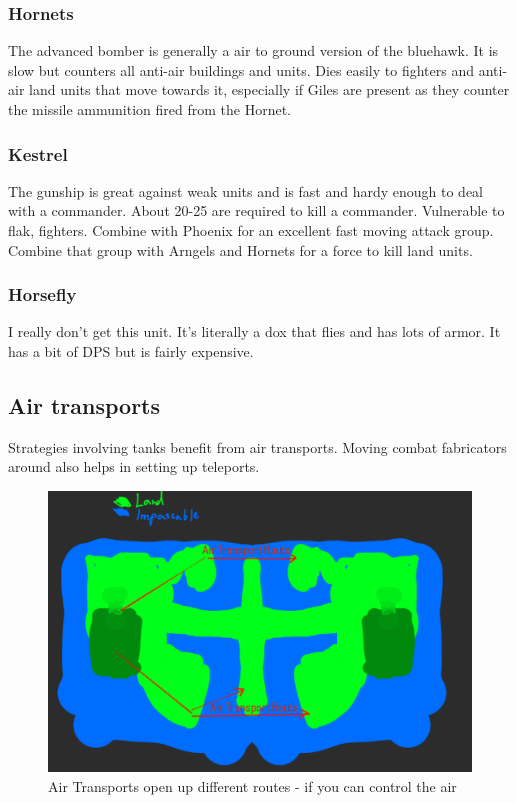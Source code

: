 \documentclass[]{article}
\begin{document}
\subsubsection{Hornets}

The advanced bomber is generally a air to ground version of the bluehawk.  It is slow but counters all anti-air buildings and units.  Dies easily to fighters and anti-air land units that move towards it, especially if Giles are present as they counter the missile ammunition fired from the Hornet.  

\subsubsection{Kestrel}

The gunship is great against weak units and is fast and hardy enough to deal with a commander.  About 20-25 are required to kill a commander.  Vulnerable to flak, fighters.  Combine with Phoenix for an excellent fast moving attack group.  Combine that group with Arngels and Hornets for a force to kill land units.  

\subsubsection{Horsefly} 

I really don't get this unit.  It's literally a dox that flies and has lots of armor.  It has a bit of DPS but is fairly expensive.  

\subsection{Air transports}

Strategies involving tanks benefit from air transports.  Moving combat fabricators around also helps in setting up teleports.  

\begin{figure}[h]
	\centering
	\includegraphics[width=1\linewidth]{k65pOTe}
	\caption{Air Transports open up different routes - if you can control the air}
	\label{fig:k65pote}
\end{figure}
\end{document}
